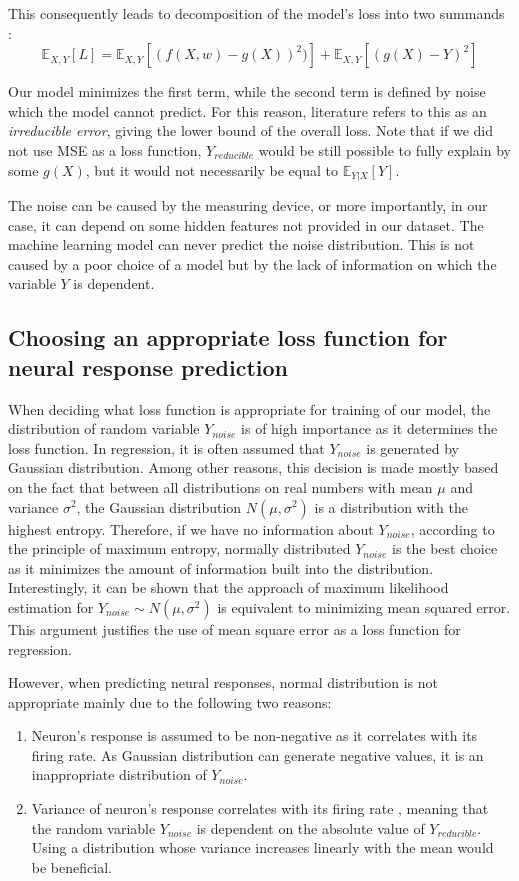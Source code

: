 This consequently leads to decomposition of the model’s loss into two summands \citep{bishop2006pattern}:
\begin{equation}
\mathbb{E}_{X, Y}[L] = 
\mathbb{E}_{X, Y}[(f(X, w) - g(X))^2)] + 
\mathbb{E}_{X, Y}[(g(X) - Y)^2]
\end{equation}

Our model minimizes the first term, while the second term is defined by noise which the model cannot predict. For this reason, literature refers to this as an \emph{irreducible error}, giving the lower bound of the overall loss. Note that if we did not use MSE as a loss function, $Y_{reducible}$ would be still possible to fully explain by some $g(X)$, but it would not necessarily be equal to $\mathbb{E}_{Y|X}[Y]$.

The noise can be caused by the measuring device, or more importantly, in our case, it can depend on some hidden features not provided in our dataset. The machine learning model can never predict the noise distribution. This is not caused by a poor choice of a model but by the lack of information on which the variable $Y$ is dependent.

\subsection{Choosing an appropriate loss function for neural response prediction}\label{appropriate-loss}

When deciding what loss function is appropriate for training of our model, the distribution of random variable $Y_{noise}$ is of high importance as it determines the loss function. In regression, it is often assumed that $Y_{noise}$ is generated by Gaussian distribution. Among other reasons, this decision is made mostly based on the fact that between all distributions on real numbers with mean $\mu$ and variance $\sigma^2$, the Gaussian distribution $N(\mu, \sigma^2)$ is a distribution with the highest entropy. Therefore, if we have no information about $Y_{noise}$, according to the principle of maximum entropy, normally distributed $Y_{noise}$ is the best choice as it minimizes the amount of information built into the distribution. Interestingly, it can be shown that the approach of maximum likelihood estimation for $Y_{noise} \sim N(\mu, \sigma^2)$ is equivalent to minimizing mean squared error. This argument justifies the use of mean square error as a loss function for regression.

However, when predicting neural responses, normal distribution is not appropriate mainly due to the following two reasons:
\begin{enumerate}
	\item Neuron’s response is assumed to be non-negative as it correlates with its firing rate. As Gaussian distribution can generate negative values, it is an inappropriate distribution of $Y_{noise}$.
	\item Variance of neuron’s response correlates with its firing rate \citep{goris2014partitioning}, meaning that the random variable $Y_{noise}$ is dependent on the absolute value of $Y_{reducible}$. Using a distribution whose variance increases linearly with the mean would be beneficial.
\end{enumerate}


